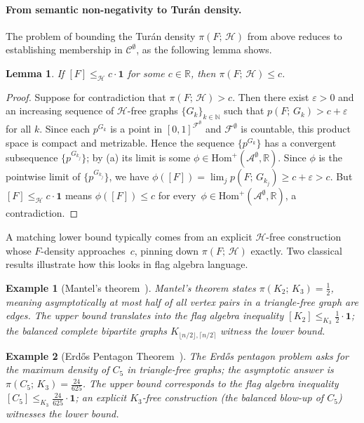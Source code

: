\documentclass{article}
\newtheorem{lemma}[lemma]{Lemma}
\newtheorem{example}[example]{Example}
\newcommand{\poshom}[1]{\mathrm{Hom}^+(\mathcal{A}^{#1}, \mathbb{R})}
\newcommand{\den}[2]{p(#1;\,#2)}
\newcommand{\tdensity}[2]{\pi(#1;\,#2)}
\begin{document}
\paragraph{From semantic non-negativity to Tur\'an density.}
The problem of bounding the Tur\'an density $\tdensity{F}{\mathcal{H}}$ from above
reduces to establishing membership in $\mathcal{C}^\emptyset$, as the following
lemma shows.

\begin{lemma}\label{lem:semantic-bound}
  If $[F] \leq_{\mathcal{H}} c \cdot \mathbf{1}$ for some $c \in \mathbb{R}$, then
  $\tdensity{F}{\mathcal{H}} \leq c$.
\end{lemma}
\begin{proof}
  Suppose for contradiction that $\tdensity{F}{\mathcal{H}} > c$.  Then
  there exist $\varepsilon > 0$ and an increasing sequence of
  \(\mathcal{H}\)-free graphs $\{G_k\}_{k\in\mathbb{N}}$ such that
  $\den{F}{G_k} > c + \varepsilon$ for all $k$.  Since each $p^{G_k}$
  is a point in $[0,1]^{\mathcal{F}^\emptyset}$ and
  $\mathcal{F}^\emptyset$ is countable, this product space is compact and
  metrizable.  Hence the sequence $\{p^{G_k}\}$ has a convergent
  subsequence $\{p^{G_{k_j}}\}$; by (a) its limit is some
  $\phi \in \poshom{\emptyset}$.  Since $\phi$ is the pointwise limit of
  $\{p^{G_{k_j}}\}$, we have
  $\phi([F]) = \lim_j \den{F}{G_{k_j}} \geq c + \varepsilon > c$.  But
  $[F] \leq_{\mathcal{H}} c \cdot \mathbf{1}$ means $\phi([F]) \leq c$ for every~$\phi \in \poshom{\emptyset}$, a contradiction.
\end{proof}

A matching lower bound typically comes from an explicit \(\mathcal{H}\)-free construction
whose $F$-density approaches~$c$, pinning down $\tdensity{F}{\mathcal{H}}$ exactly.
Two classical results illustrate how this looks in flag algebra language.

\begin{example}[Mantel's theorem~\cite{mantel}]\label{ex:mantel}
  Mantel's theorem states $\tdensity{K_2}{K_3} = \tfrac{1}{2}$, meaning
  asymptotically at most half of all vertex pairs in a triangle-free graph
  are edges.  The upper bound translates into the flag algebra inequality
  $[K_2] \leq_{K_3} \tfrac{1}{2}\cdot\mathbf{1}$; the balanced complete bipartite
  graphs $K_{\lfloor n/2\rfloor,\lceil n/2\rceil}$ witness the lower bound.
\end{example}

\begin{example}[Erd\H{o}s Pentagon Theorem~{\cite{grzesik2012,hatami2012}}]\label{ex:pentagon}
  The Erd\H{o}s pentagon problem asks for the maximum density of $C_5$ in
  triangle-free graphs; the asymptotic answer is $\tdensity{C_5}{K_3} = \tfrac{24}{625}$.  The upper bound corresponds to the flag algebra inequality
  $[C_5] \leq_{K_3} \tfrac{24}{625}\cdot\mathbf{1}$; an explicit \(K_3\)-free construction
  (the balanced blow-up of $C_5$) witnesses the lower bound.
\end{example}
\end{document}
